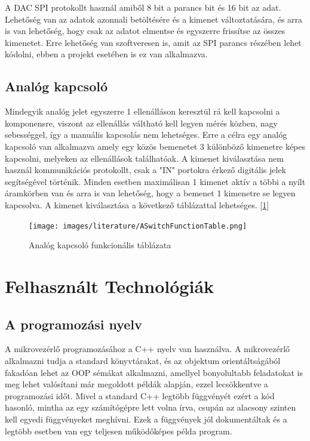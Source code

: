 A DAC SPI protokollt használ amiből 8 bit a parancs bit és 16 bit az adat.
Lehetőség van az adatok azonnali betöltésére és a kimenet változtatására, és
arra is van lehetőség, hogy csak az adatot elmentse és egyszerre frissítse az
összes kimenetet. Erre lehetőség van szoftveresen is, amit az SPI parancs
részében lehet kódolni, ebben a projekt esetében is ez van alkalmazva. 

\subsection{Analóg kapcsoló}

Mindegyik analóg jelet egyszerre 1 ellenálláson keresztül rá kell kapcsolni a komponensre,
viszont az ellenállás váltható kell legyen mérés közben, nagy sebességgel, így a manuális
kapcsolás nem lehetséges. Erre a célra egy analóg kapcsoló van alkalmazva amely egy közös
bemenetet 3 különböző kimenetre képes kapcsolni, melyeken az ellenállások találhatóak.
A kimenet kiválasztása nem használ kommunikációs protokollt, csak a "IN" portokra érkező
digitális jelek segítségével történik. Minden esetben maximálisan 1 kimenet aktív a többi
a nyílt áramkörben van és arra is van lehetőség, hogy a bemenet 1 kimenetre 
se legyen kapcsolva. A kimenet kiválasztása a következő táblázattal lehetséges.
[\ref{fig:ASwitchFuntionTable}]

\begin{figure}[h]
    \centering
    \texttt{[image: images/literature/ASwitchFunctionTable.png]}
    \caption{Analóg kapcsoló funkcionális táblázata}
    \label{fig:ASwitchFuntionTable}
\end{figure}



\section{Felhasznált Technológiák}

\subsection{A programozási nyelv}

A mikrovezérlő programozásához a C++ nyelv van használva. A mikrovezérlő alkalmazni 
tudja a standard könyvtárakat, és az objektum orientáltságából fakadóan lehet az 
OOP sémákat alkalmazni, amellyel bonyolultabb feladatokat is meg lehet valósítani
már megoldott példák alapján, ezzel lecsökkentve a programozási időt.
Mivel a standard C++ legtöbb függvényét ezért a kód hasonló, mintha az egy számítógépre
lett volna írva, csupán az alacsony szinten kell egyedi függvényeket meghívni.
Ezek a függvények jól dokumentáltak és a legtöbb esetben van egy teljesen működőképes
példa program.


